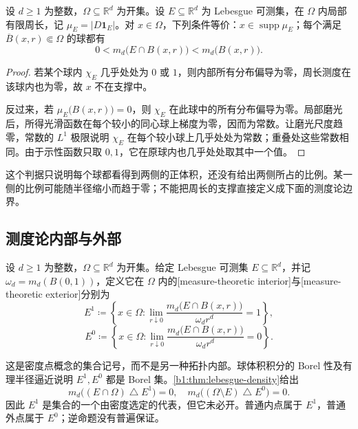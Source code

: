 \begin{proposition}\label{b1:prop:perimeter-support-locality}
设 \(d\ge1\) 为整数，\(\Omega\subseteq\mathbb R^d\) 为开集。设 \(E\subseteq\mathbb R^d\) 为 Lebesgue 可测集，在 \(\Omega\) 内局部有限周长，记 \(\mu_E=|D\mathbf1_E|\)。对 \(x\in\Omega\)，下列条件等价：\(x\in\operatorname{supp}\mu_E\)；每个满足 \(\overline B(x,r)\Subset\Omega\) 的球都有
\[
 0<m_d\bigl(E\cap B(x,r)\bigr)<m_d\bigl(B(x,r)\bigr).
\]
\end{proposition}
\begin{proof}
若某个球内 \(\chi_E\) 几乎处处为 \(0\) 或 \(1\)，则内部所有分布偏导为零，周长测度在该球内也为零，故 \(x\) 不在支撑中。

反过来，若 \(\mu_E\bigl(B(x,r)\bigr)=0\)，则 \(\chi_E\) 在此球中的所有分布偏导为零。局部磨光后，所得光滑函数在每个较小的同心球上梯度为零，因而为常数。让磨光尺度趋零，常数的 \(L^1\) 极限说明 \(\chi_E\) 在每个较小球上几乎处处为常数；重叠处这些常数相同。由于示性函数只取 \(0,1\)，它在原球内也几乎处处取其中一个值。
\end{proof}

这个判据只说明每个球都看得到两侧的正体积，还没有给出两侧所占的比例。某一侧的比例可能随半径缩小而趋于零；不能把周长的支撑直接定义成下面的测度论边界。

\subsection{测度论内部与外部}
\label{b1:subsec:270402}

\begin{definition}\label{b1:def:measure-interior-exterior}
设 \(d\ge1\) 为整数，\(\Omega\subseteq\mathbb R^d\) 为开集。给定 Lebesgue 可测集 \(E\subseteq\mathbb R^d\)，并记 \(\omega_d=m_d(B(0,1))\)，定义它在 \(\Omega\) 内的[measure-theoretic interior]与[measure-theoretic exterior]分别为
\[
 E^1\coloneqq\left\{x\in\Omega:
 \lim_{r\downarrow0}\frac{m_d\bigl(E\cap B(x,r)\bigr)}{\omega_dr^d}=1\right\},
\]
\[
 E^0\coloneqq\left\{x\in\Omega:
 \lim_{r\downarrow0}\frac{m_d\bigl(E\cap B(x,r)\bigr)}{\omega_dr^d}=0\right\}.
\]
\end{definition}

这是密度点概念的集合记号，而不是另一种拓扑内部。球体积积分的 Borel 性及有理半径逼近说明 \(E^1,E^0\) 都是 Borel 集。\cref{b1:thm:lebesgue-density}给出
\[
 m_d\bigl((E\cap\Omega)\mathbin{\triangle}E^1\bigr)=0,\quad
 m_d\bigl((\Omega\setminus E)\mathbin{\triangle}E^0\bigr)=0.
\]
因此 \(E^1\) 是集合的一个由密度选定的代表，但它未必开。普通内点属于 \(E^1\)，普通外点属于 \(E^0\)；逆命题没有普遍保证。

